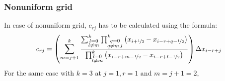 \documentclass[12pt,a4paper,fleqn]{article}
\begin{document}
\subsubsection{Nonuniform grid}
In case of nonuniform grid, \(c_{rj}\) has to be calculated using the formula:
\begin{equation}
c_{rj} = \left(\sum_{m=j+1}^{k}
\frac{\sum_{\substack{l=0\\l\ne m}}^{k}
    \prod_{\substack{q=0\\q\ne m,l}}^{k}
    \left(x_{i+\nicefrac{1}{2}}-x_{i-r+q-\nicefrac{1}{2}}\right)}
{\prod_{\substack{l=0\\l\ne m}}^{k}
    \left(x_{i-r+m-\nicefrac{1}{2}}-x_{i-r+l-\nicefrac{1}{2}}\right)}\right)
\Delta x_{i-r+j}
\end{equation}
For the same case with \(k=3\) at \(j=1, r=1 \text{ and } m=j+1=2\),
\end{document}
